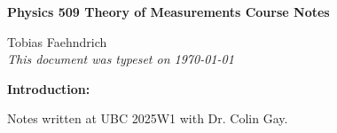 \documentclass[10pt]{article}
\begin{document}
\begin{tcolorbox}
  \begin{center}
    \begin{Large}
      \textbf{Physics 509 Theory of Measurements Course Notes} \\
      \vspace{5pt}
    \end{Large}
    \begin{large}
      Tobias Faehndrich \\
      \vspace{5pt}
      \emph{This document was typeset on \today}
    \end{large}
  \end{center}
\end{tcolorbox}

\begin{center}
  \textbf{Introduction:}

  Notes written at UBC 2025W1 with Dr. Colin Gay.

\end{center}
\tableofcontents

\newpage


\newpage


\newpage


\newpage


\newpage


\newpage

\end{document}
